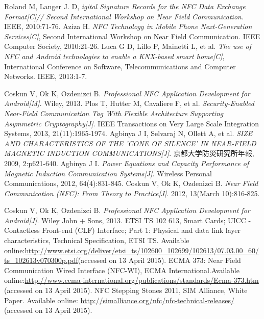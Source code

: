 \documentclass[journal]{IEEEtran}
\begin{document}
\begin{thebibliography}{1}
Roland M, Langer J. D, \emph{igital Signature Records for the NFC Data Exchange Format[C]// Second International Workshop on Near Field Communication}. IEEE, 2010:71-76.
Aziza H. \emph{NFC Technology in Mobile Phone Next-Generation Services[C]}, Second International Workshop on Near Field Communication. IEEE Computer Society, 2010:21-26.
Luca G D, Lillo P, Mainetti L, et al. \emph{The use of NFC and Android technologies to enable a KNX-based smart home[C]}, International Conference on Software, Telecommunications and Computer Networks. IEEE, 2013:1-7.

Coskun V, Ok K, Ozdenizci B. \emph{Professional NFC Application Development for Android[M]}. Wiley, 2013.
Plos T, Hutter M, Cavaliere F, et al. \emph{Security-Enabled Near-Field Communication Tag With Flexible Architecture Supporting Asymmetric Cryptography[J]}. IEEE Transactions on Very Large Scale Integration Systems, 2013, 21(11):1965-1974.
Agbinya J I, Selvaraj N, Ollett A, et al.\emph{ SIZE AND CHARACTERISTICS OF THE 'CONE OF SILENCE' IN NEAR-FIELD MAGNETIC INDUCTION COMMUNICATIONS[J]}. 京都大学防災研究所年報, 2009, 2:p621-640.
Agbinya J I. \emph{Power Equations and Capacity Performance of Magnetic Induction Communication Systems[J]}. Wireless Personal Communications, 2012, 64(4):831-845.
Coskun V, Ok K, Ozdenizci B. \emph{Near Field Communication (NFC): From Theory to Practice[J]}. 2012, 13(March 10):816-825.

Coskun V, Ok K, Ozdenizci B. \emph{Professional NFC Application Development for Android[J]}. Wiley John + Sons, 2013.
ETSI TS 102 613, Smart Cards; UICC - Contactless Front-end (CLF) Interface; Part 1: Physical and data link layer characteristics, Technical Specification, ETSI TS. Available online:\url{http://www.etsi.org/deliver/etsi_ts/102600_102699/102613/07.03.00_60/ts_102613v070300p.pdf}(accessed on 13 April 2015).
ECMA 373: Near Field Communication Wired Interface (NFC-WI), ECMA International.Available online:\url{http://www.ecma-international.org/publications/standards/Ecma-373.htm}
(accessed on 13 April 2015).
NFC Stepping Stones 2011, SIM Alliance, White Paper. Available online: \url{http://simalliance.org/nfc/nfc-technical-releases/} (accessed on 13 April 2015).


\end{thebibliography}
\end{document}
